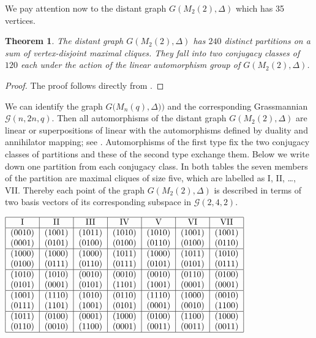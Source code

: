 \documentclass[12pt,a4paper]{article}
\newtheorem{theorem}{Theorem}
\theoremstyle{definition}
\begin{document}
We pay attention now to the distant graph $G(M_2(2), \Delta)$ which has 35 vertices. 
 \begin{theorem}
The distant graph $G(M_2(2), \Delta)$ has $240$ distinct partitions on a sum of vertex-disjoint maximal cliques. They fall into two conjugacy classes of $120$ each under the action of the linear automorphism group of $G(M_2(2), \Delta)$.
\end{theorem}
\begin{proof}
The proof follows directly from \cite[Theorem 17.5.6 ii]{hir}.
\end{proof} 
We can identify the graph $G\big(M_n(q), \Delta)\big)$ and the corresponding Grassmannian $\mathscr{G}(n, 2n, q)$. Then all automorphisms of the distant graph $G(M_2(2), \Delta)$ are linear or superpositions of linear with the automorphisms defined by duality and annihilator mapping; see \cite{pankov}. Automorphisms of the first type fix the two conjugacy classes of partitions and these of the second type exchange them. \newline
Below we write down one partition from each conjugacy class. In both tables the seven members of the partition are maximal cliques of size five, which are labelled as I, II, \ldots, VII. Thereby each point of  the graph $G(M_2(2), \Delta)$ is described in terms of two basis vectors of its  corresponding subspace in $\mathscr{G}(2,4,2)$.
\begin{table}[h]
\centerline{$\begin{tabular}{|c|c|c|c|c|c|c|}\hline
I&II&III&IV&V&VI&VII\\ \hline
 (0010) & (1001) & (1011) & (1010) & (1010) & (1001) & (1001)\\
(0001) & (0101) & (0100) & (0100) & (0110) & (0100) & (0110)\\ \hline
 (1000) & (1000) & (1000) & (1011) & (1000) & (1011) & (1010) \\
(0100) & (0111) & (0110) & (0111) & (0101) & (0101) & (0111)\\ \hline
(1010) & (1010) & (0010) & (0010) & (0010) & (0110) & (0100) \\
(0101) & (0001) & (0101) & (1101) & (1001) & (0001) & (0001)\\  \hline
(1001) & (1110) & (1010) & (0110) & (1110) & (1000) & (0010) \\
(0111) & (1101) & (1001) & (0101) & (0001) & (0010) & (1100)\\ \hline
(1011) & (0100) & (0001) & (1000) & (0100) & (1100) & (1000) \\
(0110) & (0010) & (1100) & (0001) & (0011) & (0011) & (0011)\\  \hline
\end{tabular}$}
\caption{Partition 1}
\label{table1}
\end{table}
\end{document}
